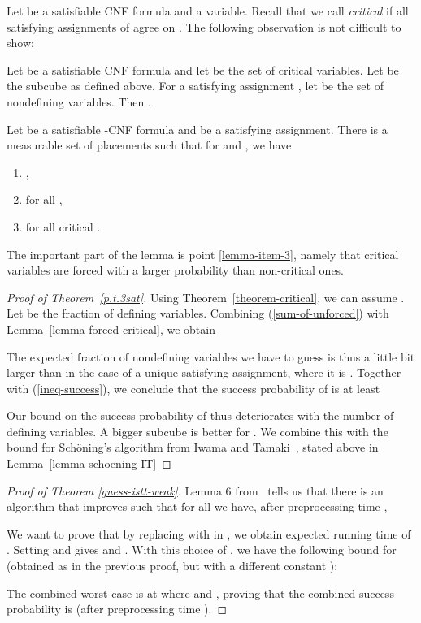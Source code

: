 Let  be a satisfiable CNF formula and
 a variable. Recall that we call  {\em critical} if all satisfying assignments
of  agree on . The following observation is not difficult
to show:
\begin{observation}
  Let  be a satisfiable CNF formula and let  be the set of
  critical variables. Let  be the subcube as defined
  above. For a satisfying assignment , let  be the
  set of nondefining variables. 
  Then .
\end{observation}
\begin{lemma}
  Let  be a satisfiable -CNF formula and  be a
  satisfying assignment. There is a measurable set  of placements such that for  and
  , we have
  \begin{enumerate}
  \item ,
  \item  for all ,
  \item  for all critical .
      \label{lemma-item-3}
    \end{enumerate}
    \label{lemma-forced-critical}
\end{lemma}
The important part of the lemma is point \ref{lemma-item-3}, namely
that critical variables are forced with a larger probability than
non-critical ones.
\begin{proof}[Proof of Theorem~\ref{p.t.3sat}]
Using Theorem~\ref{theorem-critical}, we can assume .
Let  be the fraction of defining
  variables.
  Combining (\ref{sum-of-unforced}) with Lemma~\ref{lemma-forced-critical},
  we obtain
  
  The expected fraction of nondefining variables we have to guess is
  thus a little bit larger than in the case of a unique satisfying
  assignment, where it is . Together with
  (\ref{ineq-success}), we conclude that the success probability
  of  is at least
  
  Our bound on the success probability of  thus deteriorates with
  the number of defining variables. A bigger subcube  is
  better for . We combine this with the bound for Sch\"oning's
  algorithm from Iwama and Tamaki~\cite{it04}, stated 
  above in Lemma~\ref{lemma-schoening-IT}
  
  \end{proof}
\begin{proof}[Proof of Theorem \ref{guess-istt-weak}]
Lemma 6 from~\cite{istt10} tells us that there is an algorithm  that improves  such that for all  we have, after preprocessing time ,

We want to prove that by replacing  with  in , we obtain expected running time of
  . Setting  and  gives  and . With this choice of , we have the following bound for  (obtained as in the previous proof, but with a different constant ):

The combined worst case is at  where
 and
, proving that the combined success probability is  (after preprocessing time ).
\end{proof}

